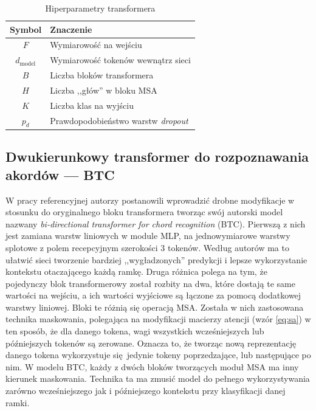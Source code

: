 \begin{table}
    \centering
    \caption{Hiperparametry transformera}
    \label{tab:transformer_params}
    \begin{tabular}{|c|l|} \hline
        Symbol & Znaczenie \\ \hline
        $F$ & Wymiarowość na wejściu \\
        $d_{\mathrm{model}}$ & Wymiarowość tokenów wewnątrz sieci \\
        $B$ & Liczba bloków transformera \\
        $H$ & Liczba ,,głów'' w bloku MSA \\
        $K$ & Liczba klas na wyjściu \\
        $p_d$ & Prawdopodobieństwo warstw \emph{dropout} \\ \hline
    \end{tabular}
\end{table}

\subsection{Dwukierunkowy transformer do rozpoznawania akordów --- BTC}

W pracy referencyjnej \cite{park_bi-directional_2019} autorzy postanowili wprowadzić drobne
modyfikacje w stosunku do oryginalnego bloku transformera tworząc swój autorski model nazwany
\emph{bi-directional transformer for chord recognition} (BTC). Pierwszą z nich jest zamiana warstw
liniowych w module MLP, na jednowymiarowe warstwy splotowe z polem recepcyjnym szerokości 3 tokenów.
Według autorów ma to ułatwić sieci tworzenie bardziej ,,wygładzonych'' predykcji i lepsze
wykorzystanie kontekstu otaczającego każdą ramkę. Druga różnica polega na tym, że pojedynczy blok
transformerowy został rozbity na dwa, które dostają te same wartości na wejściu, a ich wartości
wyjściowe są łączone za pomocą dodatkowej warstwy liniowej. Bloki te różnią się operacją MSA.
Została w nich zastosowana technika maskowania, polegająca na modyfikacji macierzy atencji (wzór
\ref{eq:sa}) w ten sposób, że dla danego tokena, wagi wszystkich wcześniejszych lub późniejszych
tokenów są zerowane. Oznacza to, że tworząc nową reprezentację danego tokena wykorzystuje
się jedynie tokeny poprzedzające, lub następujące po nim. W modelu BTC, każdy z dwóch bloków
tworzących moduł MSA ma inny kierunek maskowania. Technika ta ma zmusić model do pełnego
wykorzystywania zarówno wcześniejszego jak i późniejszego kontekstu przy klasyfikacji danej ramki.



